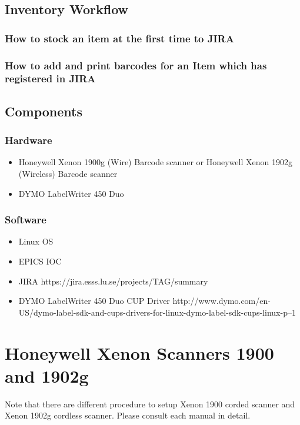 \documentclass[11pt
  , a4paper
  , article
  , oneside
  , showtrims
]{memoir}
\begin{document}
\section{Inventory Workflow}

\subsection{How to stock an item at the first time to JIRA}

\subsection{How to add and print barcodes for an Item which has registered in JIRA}

\section{Components}
\subsection{Hardware}
\begin{itemize}
\item Honeywell Xenon 1900g (Wire) Barcode scanner or Honeywell Xenon 1902g (Wireless) Barcode scanner
\item DYMO LabelWriter 450 Duo
\end{itemize}
\subsection{Software}
\begin{itemize}
\item Linux OS
\item EPICS IOC
\item JIRA https://jira.esss.lu.se/projects/TAG/summary
\item DYMO LabelWriter 450 Duo CUP Driver
  http://www.dymo.com/en-US/dymo-label-sdk-and-cups-drivers-for-linux-dymo-label-sdk-cups-linux-p--1
\end{itemize}



    
\newpage

\chapter{Honeywell Xenon Scanners 1900 and 1902g}
Note that there are different procedure to setup Xenon 1900 corded scanner and Xenon 1902g cordless scanner. Please consult each manual in detail.
\end{document}
